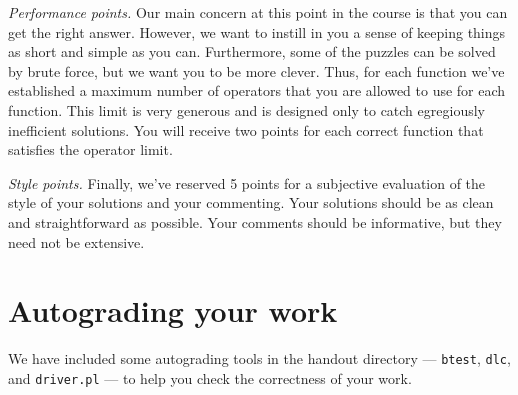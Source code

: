 \documentclass[11pt]{article}
\begin{document}
{\em Performance points.}  Our main concern at this point in the course is
that you can get the right answer.  However, we want to instill in you
a sense of keeping things as short and simple as you can.
Furthermore, some of the puzzles can be solved by brute force, but we
want you to be more clever.  Thus, for each function we've established
a maximum number of operators that you are allowed to use for each
function. This limit is very generous and is designed only to catch
egregiously inefficient solutions.  You will receive two points for
each correct function that satisfies the operator limit.

{\em Style points.} Finally, we've reserved 5 points for a subjective
evaluation of the style of your solutions and your commenting.  Your
solutions should be as clean and straightforward as possible.  Your
comments should be informative, but they need not be extensive.

\section*{Autograding your work}

We have included some autograding tools in the handout directory ---
\texttt{btest}, \texttt{dlc}, and \texttt{driver.pl} --- to help you
check the correctness of your work.
\end{document}
